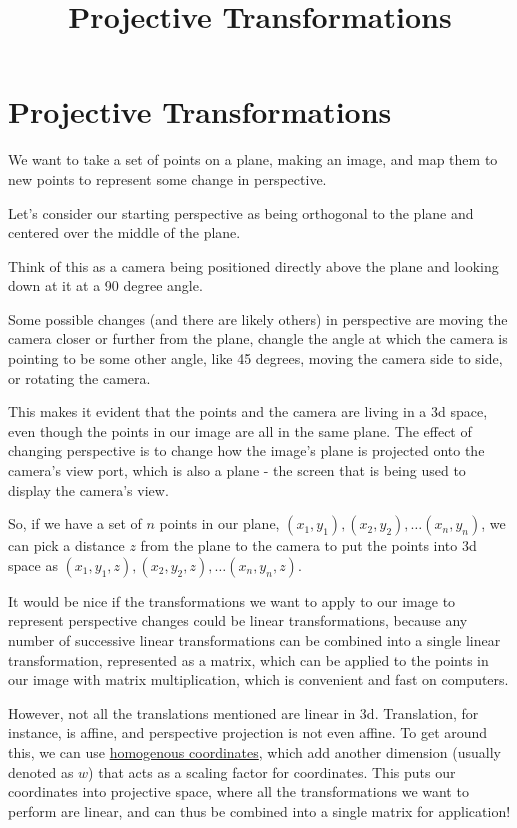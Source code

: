\documentclass{article}
\title{Projective Transformations}
\begin{document}
\section{Projective Transformations}

We want to take a set of points on a plane, making an image, and map them to new points to represent some change in perspective.

Let's consider our starting perspective as being orthogonal to the plane and centered over the middle of the plane.

Think of this as a camera being positioned directly above the plane and looking down at it at a 90 degree angle.

Some possible changes (and there are likely others) in perspective are moving the camera closer or further from the plane, changle the angle at which
the camera is pointing to be some other angle, like 45 degrees, moving the camera side to side, or rotating the camera.

This makes it evident that the points and the camera are living in a 3d space, even though the points in our image are all in
the same plane. The effect of changing perspective is to change how the image's plane is projected onto the camera's view port, which
is also a plane - the screen that is being used to display the camera's view.

So, if we have a set of $n$ points in our plane, ${(x_1, y_1), (x_2, y_2), \dots (x_n, y_n)}$, we can pick a distance $z$ from the plane
to the camera to put the points into 3d space as ${(x_1, y_1, z), (x_2, y_2, z), \dots (x_n, y_n, z)}.$ 

It would be nice if the transformations we want to apply to our image to represent perspective changes could be
linear transformations, because any number of successive linear transformations can be combined into a single linear transformation, represented as
a matrix, which can be applied to the points in our image with matrix multiplication, which is convenient and fast on computers.

However, not all the translations mentioned are linear in 3d. Translation, for instance, is affine, and perspective projection is not even
affine. To get around this, we can use \href{https://en.wikipedia.org/wiki/Homogeneous_coordinates}{homogenous coordinates}, which add another dimension
(usually denoted as $w$) that acts as a scaling factor for coordinates. This puts our coordinates into projective space, where all the transformations we want to perform are linear, and can thus be combined into a single matrix for application!
\end{document}

